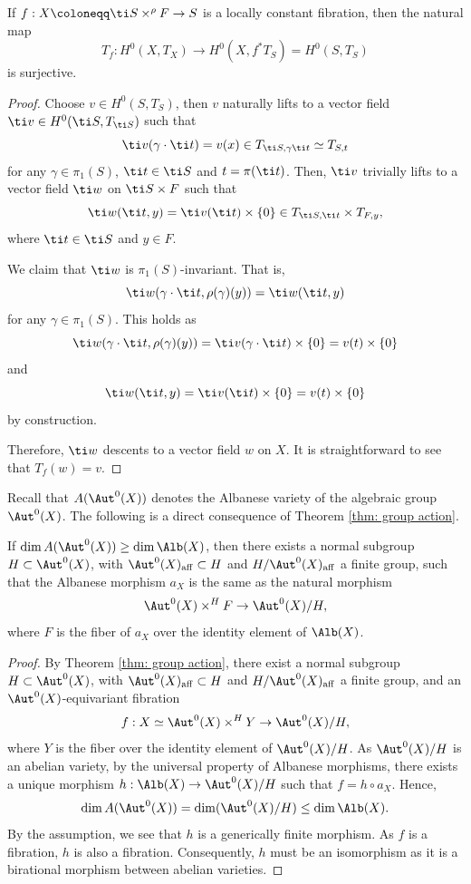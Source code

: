 \documentclass[11pt]{amsart}
\begin{document}
\begin{lemma}\label{lem: lift vector field}
    If $f: X \coloneqq \ti S \times^\rho F \to S$ is a locally constant fibration, then the natural map 
    \[
    T_f: H^0(X, T_X) \to H^0(X,f^*T_S)=H^0(S, T_S)
    \] is surjective. 
\end{lemma}
\begin{proof}
    Choose $v \in H^0(S, T_S)$, then $v$ naturally lifts to a vector field $\ti v \in H^0(\ti S, T_{\ti S})$ such that
    \[
    \ti v(\gamma \cdot \ti t) = v(x) \in T_{\ti S, \gamma\ti t} \simeq T_{S, t}
    \] for any $\gamma\in \pi_1(S)$, $\ti t \in \ti S$ and $t = \pi(\ti t)$. Then, $\ti v$ trivially lifts to a vector field $\ti w$ on $\ti S \times F$ such that
    \[
    \ti w(\ti t, y)= \ti v(\ti t) \times \{0\} \in T_{\ti S, \ti t} \times T_{F,y},
    \] where $\ti t\in\ti S$ and $y\in F$.

    We claim that $\ti w$ is $\pi_1(S)$-invariant. That is,
    \[
    \ti w(\gamma \cdot \ti t, \rho(\gamma)(y)) = \ti w(\ti t, y)
    \] for any $\gamma\in \pi_1(S)$. This holds as 
    \[
    \ti w(\gamma\cdot \ti t, \rho(\gamma)(y)) = \ti v(\gamma\cdot \ti t) \times \{0\}= v(t) \times \{0\}
    \] and
    \[
    \ti w(\ti t, y) = \ti v(\ti t) \times \{0\}= v(t) \times \{0\}
    \] by construction.

    Therefore, $\ti w$ descents to a vector field $w$ on $X$. It is straightforward to see that $T_f(w)=v$.
\end{proof}


Recall that $A(\Aut^0(X))$ denotes the Albanese variety of the algebraic group $\Aut^0(X)$. The following is a direct consequence of Theorem \ref{thm: group action}. 

\begin{lemma}\label{lem: same as Alb}
    If $\dim A(\Aut^0(X)) \geq \dim \Alb(X)$, then there exists a normal subgroup $H \subset \Aut^0(X)$, with $\Aut^0(X)_{\rm aff} \subset H$ and $H/\Aut^0(X)_{\rm aff}$ a finite group, such that the Albanese morphism $a_X$ is the same as the natural morphism 
    \[
    \Aut^0(X) \times^H F \to \Aut^0(X)/H,
    \] where $F$ is the fiber of $a_X$ over the identity element of $\Alb(X)$.
\end{lemma}
\begin{proof}
    By Theorem \ref{thm: group action}, there exist a normal subgroup  $H \subset \Aut^0(X)$, with $\Aut^0(X)_{\rm aff} \subset H$ and $H/\Aut^0(X)_{\rm aff}$ a finite group, and an $\Aut^0(X)$-equivariant fibration
    \[
    f: X \simeq \Aut^0(X) \times^H Y \to \Aut^0(X)/H,
    \] where $Y$ is the fiber over the identity element of $\Aut^0(X)/H$. As $\Aut^0(X)/H$ is an abelian variety, by the universal property of Albanese morphisms, there exists a unique morphism $h: \Alb(X) \to \Aut^0(X)/H$ such that $f= h \circ a_X$. Hence, 
    \[
    \dim A(\Aut^0(X)) = \dim (\Aut^0(X)/H) \leq \dim \Alb(X).
    \] By the assumption, we see that $h$ is a generically finite morphism. As $f$ is a fibration, $h$ is also a fibration. Consequently, $h$ must be an isomorphism as it is a birational morphism between abelian varieties. 
\end{proof}
\end{document}
